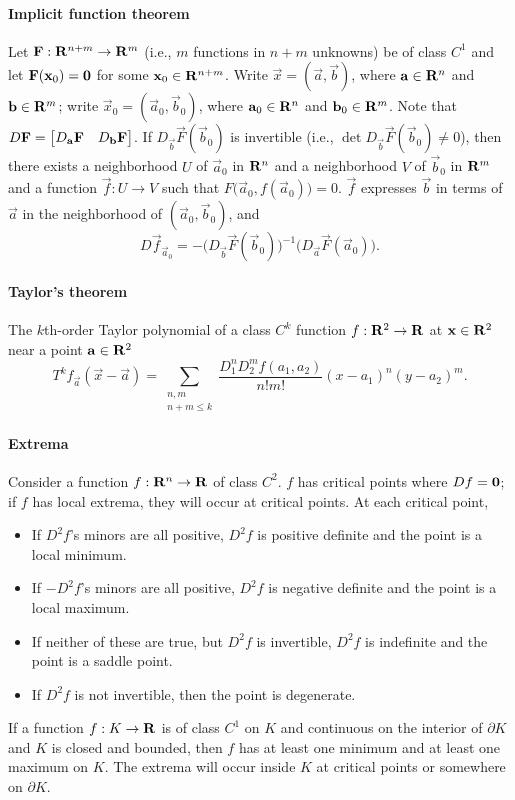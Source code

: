 \documentclass[10pt,landscape]{article}
\begin{document}
\begin{multicols*}{3}
\paragraph{Implicit function theorem}
Let $\mathbf{F} : \mathbf{R}^{n+m} \to \mathbf{R}^m$ (i.e., $m$ functions in $n + m$ unknowns) be of class $C^1$ and let $\mathbf{F}(\mathbf{x}_0) = \mathbf{0}$ for some $\mathbf{x}_0 \in \mathbf{R}^{n+m}$.
Write $\vec x = (\vec a, \vec b)$, where $\mathbf{a} \in \mathbf{R}^n$ and $\mathbf{b} \in \mathbf{R}^m$; write $\vec x_0 = (\vec a_0, \vec b_0)$, where $\mathbf{a}_0 \in \mathbf{R}^n$ and $\mathbf{b}_0 \in \mathbf{R}^m$.
Note that $D\mathbf{F} = \begin{bmatrix} D_{\mathbf{a}}\mathbf{F} & D_{\mathbf{b}}\mathbf{F} \end{bmatrix}$.
If $D_{\vec b}\vec F(\vec b_0)$ is invertible (i.e., $\det D_{\vec b}\vec F(\vec b_0) \ne 0$), then there exists a neighborhood $U$ of $\vec a_0$ in $\mathbf{R}^n$ and a neighborhood $V$ of $\vec b_0$ in $\mathbf{R}^m$ and a function $\vec f : U \to V$ such that $F\big(\vec a_0, f(\vec a_0)\big) = 0$.
$\vec f$ expresses $\vec b$ in terms of $\vec a$ in the neighborhood of $(\vec a_0, \vec b_0)$, and
\begin{equation}
  \label{eq:implicitdiff}
  D\vec f_{\vec a_0} = -\big(D_{\vec b}\vec F(\vec b_0)\big)^{-1}\big(D_{\vec a}\vec F(\vec a_0)\big).
\end{equation}

\paragraph{Taylor's theorem}
The $k$th-order Taylor polynomial of a class $C^k$ function $f : \mathbf{R}^2 \to \mathbf{R}$ at $\mathbf{x} \in \mathbf{R}^2$ near a point $\mathbf{a} \in \mathbf{R}^2$
\begin{equation}
  T^kf_{\vec a}(\vec x - \vec a) = \sum_{\substack{n,m\\n+m \le k}} \frac{D_1^nD_2^m f(a_1,a_2)}{n!m!}(x - a_1)^n(y - a_2)^m.
\end{equation}

\paragraph{Extrema}
Consider a function $f : \mathbf{R}^n \to \mathbf{R}$ of class $C^2$.
$f$ has critical points where $Df = \mathbf{0}$; if $f$ has local extrema, they will occur at critical points.
At each critical point,
\begin{itemize}
\item If $D^2f$'s minors are all positive, $D^2f$ is positive definite and the point is a local minimum.
\item If $-D^2f$'s minors are all positive, $D^2f$ is negative definite and the point is a local maximum.
\item If neither of these are true, but $D^2f$ is invertible, $D^2f$ is indefinite and the point is a saddle point.
\item If $D^2f$ is not invertible, then the point is degenerate.
\end{itemize}
If a function $f : K \to \mathbf{R}$ is of class $C^1$ on $K$ and continuous on the interior of $\partial K$ and $K$ is closed and bounded, then $f$ has at least one minimum and at least one maximum on $K$.
The extrema will occur inside $K$ at critical points or somewhere on $\partial K$.


\end{multicols*}
\end{document}

